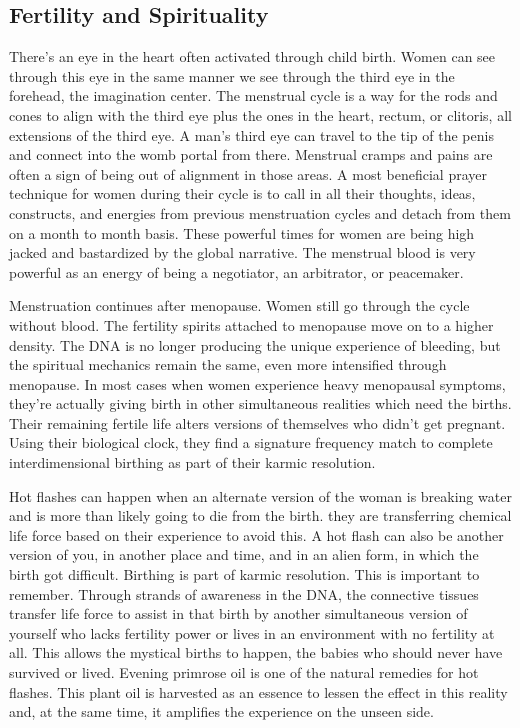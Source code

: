 \subsection{Fertility and
Spirituality}\label{fertility-and-spirituality}

There's an eye in the heart often activated through child birth. Women
can see through this eye in the same manner we see through the third eye
in the forehead, the imagination center. The menstrual cycle is a way
for the rods and cones to align with the third eye plus the ones in the
heart, rectum, or clitoris, all extensions of the third eye. A man's
third eye can travel to the tip of the penis and connect into the womb
portal from there. Menstrual cramps and pains are often a sign of being
out of alignment in those areas. A most beneficial prayer technique for
women during their cycle is to call in all their thoughts, ideas,
constructs, and energies from previous menstruation cycles and detach
from them on a month to month basis. These powerful times for women are
being high jacked and bastardized by the global narrative. The menstrual
blood is very powerful as an energy of being a negotiator, an
arbitrator, or peacemaker.

Menstruation continues after menopause. Women still go through the cycle
without blood. The fertility spirits attached to menopause move on to a
higher density. The DNA is no longer producing the unique experience of
bleeding, but the spiritual mechanics remain the same, even more
intensified through menopause. In most cases when women experience heavy
menopausal symptoms, they're actually giving birth in other simultaneous
realities which need the births. Their remaining fertile life alters
versions of themselves who didn't get pregnant. Using their biological
clock, they find a signature frequency match to complete
interdimensional birthing as part of their karmic resolution.

Hot flashes can happen when an alternate version of the woman is
breaking water and is more than likely going to die from the birth. they
are transferring chemical life force based on their experience to avoid
this. A hot flash can also be another version of you, in another place
and time, and in an alien form, in which the birth got difficult.
Birthing is part of karmic resolution. This is important to remember.
Through strands of awareness in the DNA, the connective tissues transfer
life force to assist in that birth by another simultaneous version of
yourself who lacks fertility power or lives in an environment with no
fertility at all. This allows the mystical births to happen, the babies
who should never have survived or lived. Evening primrose oil is one of
the natural remedies for hot flashes. This plant oil is harvested as an
essence to lessen the effect in this reality and, at the same time, it
amplifies the experience on the unseen side.

